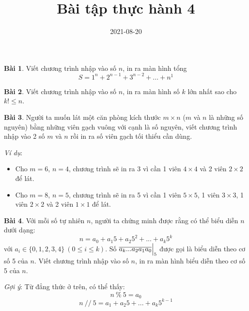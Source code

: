 \documentclass[12pt, a4paper]{article}
\title{Bài tập thực hành 4}
\date{2021-08-20}
\author{}
\begin{document}
    \onehalfspacing
    \maketitle
    \textbf{Bài 1}. Viết chương trình nhập vào số $n$, in ra màn hình tổng
	$$S = 1^n + 2^{n-1} + 3^{n-2} + ... + n^1$$

	\textbf{Bài 2}. Viết chương trình nhập vào số $n$, in ra màn hình số $k$ lớn nhất sao cho $k! \leq n$.

	\textbf{Bài 3}. Người ta muốn lát một căn phòng kích thước $m \times n$ ($m$ và $n$ là những số nguyên) bằng những viên gạch vuông với cạnh là số nguyên,
	viết chương trình nhập vào 2 số $m$ và $n$ rồi in ra số viên gạch tối thiểu cần dùng.

	\textit{Ví dụ}:
	\begin{itemize}
		\item Cho $m = 6$, $n = 4$, chương trình sẽ in ra 3 vì cần 1 viên $4 \times 4$ và 2 viên $2 \times 2$ để lát.
		\item Cho $m = 8$, $n = 5$, chương trình sẽ in ra 5 vì cần 1 viên $5 \times 5$, 1 viên $3 \times 3$, 1 viên $2 \times 2$ và 2 viên $1 \times 1$ để lát.
	\end{itemize} 
	
	\textbf{Bài 4}. Với mỗi số tự nhiên $n$, người ta chứng minh được rằng có thể biểu diễn $n$ dưới dạng:
	$$n = a_0 + a_1 5 + a_2 5^2 + ... + a_k 5^k$$
	với $a_i \in \{0, 1, 2, 3, 4\}\ (0 \leq i \leq k)$. Số $\Bigl.\overline{a_k ... a_2 a_1 a_0}\Bigr|_5$ được gọi là biểu diễn theo cơ số 5 của $n$.
	Viết chương trình nhập vào số $n$, in ra màn hình biểu diễn theo cơ số 5 của $n$.

	\textit{Gợi ý}: Từ đẳng thức ở trên, có thể thấy:
	$$n\ \%\ 5 = a_0$$
	$$n\ //\ 5 = a_1 + a_2 5 + ... + a_k 5^{k-1}$$
\end{document}
